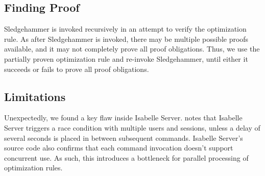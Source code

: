 \documentclass[conference,a4paper,english,10pt]{IEEEtran}[2015/08/26]
\begin{document}


\subsection{Finding Proof}
\label{sec:findproof}


Sledgehammer is invoked recursively in an attempt to verify the optimization rule. As after Sledgehammer is invoked, there may be multiple 
possible proofs available, and it may not completely prove all proof obligations. Thus, we use the partially proven optimization rule and 
re-invoke Sledgehammer, until either it succeeds or fails to prove all proof obligations.

\subsection{Limitations}
\label{sec:limitations}

Unexpectedly, we found a key flaw inside Isabelle Server.
\citet{kobschatzki_unexpected_2024} notes that Isabelle Server triggers a race condition with multiple users and sessions, unless a 
delay of several seconds is placed in between subsequent commands. Isabelle Server's source code also confirms that each command invocation 
doesn't support concurrent use. As such, this introduces a bottleneck for parallel processing of optimization rules.
\end{document}
